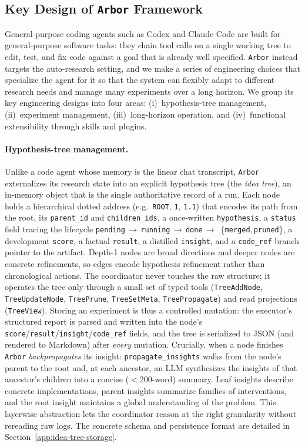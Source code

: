 \documentclass{llmxive}
\providecommand{\arbor}{\texttt{Arbor}}
\begin{document}
\subsection{Key Design of \arbor{} Framework}
\label{app:framework-key-design}
General-purpose coding agents such as Codex and Claude Code are built for
general-purpose software tasks: they chain tool calls on a single working tree
to edit, test, and fix code against a goal that is already well specified.
\arbor{} instead targets the auto-research setting, and we make a series of
engineering choices that specialize the agent for it so that the system can
flexibly adapt to different research needs and manage many experiments over a
long horizon. We group its key engineering designs into four areas: (i)~hypothesis-tree management,
(ii)~experiment management, (iii)~long-horizon operation, and (iv)~functional
extensibility through skills and plugins.

\paragraph{Hypothesis-tree management.}
Unlike a code agent whose memory is the linear chat transcript, \arbor{}
externalizes its research state into an explicit hypothesis tree (the
\emph{idea tree}), an in-memory object that is the single authoritative record
of a run. Each node holds a hierarchical dotted address (e.g.\ \texttt{ROOT},
\texttt{1}, \texttt{1.1}) that encodes its path from the root, its
\texttt{parent\_id} and \texttt{children\_ids}, a once-written
\texttt{hypothesis}, a \texttt{status} field tracing the lifecycle
\texttt{pending}\,$\to$\,\texttt{running}\,$\to$\,\texttt{done}\,$\to$\,%
\{\texttt{merged},\,\texttt{pruned}\}, a development \texttt{score}, a factual
\texttt{result}, a distilled \texttt{insight}, and a \texttt{code\_ref} branch
pointer to the artifact. Depth-1 nodes are broad directions and deeper nodes are
concrete refinements, so edges encode hypothesis refinement rather than
chronological actions. The coordinator never touches the raw structure; it
operates the tree only through a small set of typed tools
(\texttt{TreeAddNode}, \texttt{TreeUpdateNode}, \texttt{TreePrune},
\texttt{TreeSetMeta}, \texttt{TreePropagate}) and read projections
(\texttt{TreeView}). Storing an experiment is thus a controlled mutation: the
executor's structured report is parsed and written into the node's
\texttt{score}/\texttt{result}/\texttt{insight}/\texttt{code\_ref} fields, and
the tree is serialized to JSON (and rendered to Markdown) after \emph{every}
mutation. Crucially, when a node finishes \arbor{} \emph{backpropagates} its
insight: \texttt{propagate\_insights} walks from the node's parent to the root
and, at each ancestor, an LLM synthesizes the insights of that ancestor's
children into a concise ($<$200-word) summary. Leaf insights describe concrete
implementations, parent insights summarize families of interventions, and the
root insight maintains a global understanding of the problem. This layerwise
abstraction lets the coordinator reason at the right granularity without
rereading raw logs. The concrete schema and persistence format are detailed in
Section~\ref{app:idea-tree-storage}.
\end{document}
